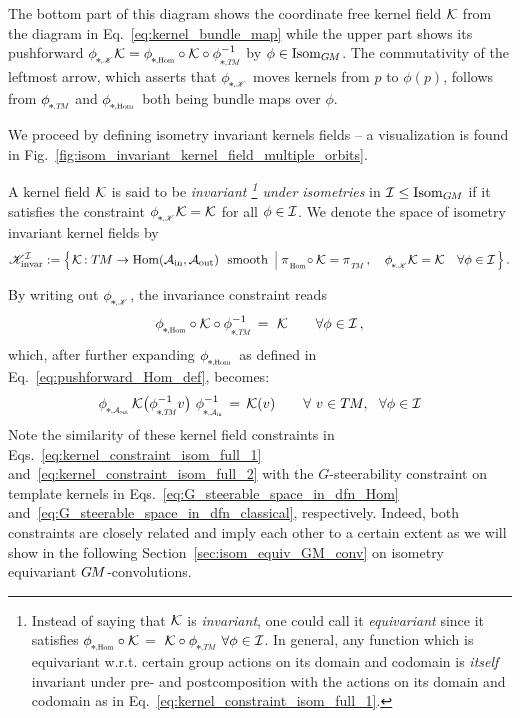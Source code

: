 The bottom part of this diagram shows the coordinate free kernel field $\mathcal{K}$ from the diagram in Eq.~\eqref{eq:kernel_bundle_map} while the upper part shows its pushforward $\dphiK \K = \dphiHom \!\circ \K \circ \dphiTMinv$ by $\phi \in \operatorname{Isom}_{G\mkern-1.4muM}$.
The commutativity of the leftmost arrow, which asserts that $\dphiK$ moves kernels from $p$ to $\phi(p)$, follows from $\dphiTM$ and $\dphiHom$ both being bundle maps over $\phi$.


We proceed by defining isometry invariant kernels fields -- a visualization is found in Fig.~\ref{fig:isom_invariant_kernel_field_multiple_orbits}.
\begin{dfn}
\label{dfn:isometry_invariant_kernel_fields}
    A kernel field $\mathcal{K}$ is said to be \emph{invariant%
    \footnote{
        Instead of saying that $\mathcal{K}$ is \emph{invariant}, one could call it \emph{equivariant} since it satisfies
        $\dphiHom \!\circ \K \,=\ \K \circ \dphiTM \ \forall \phi\in\I$.
        In general, any function which is equivariant w.r.t. certain group actions on its domain and codomain is \emph{itself} invariant under pre- and postcomposition with the actions on its domain and codomain as in Eq.~\eqref{eq:kernel_constraint_isom_full_1}.
    }
    under isometries} in $\mathcal{I} \leq \operatorname{Isom}_{G\mkern-1.4muM}$ if it satisfies the constraint $\dphiK \K = \K$ for all $\phi \in \mathcal{I}$.
    We denote the space of isometry invariant kernel fields by
    \begin{align}\label{eq:KIfull_def}
        \KIfull :=
            \pig\{\mkern2mu \K\mkern-2mu:\TM\to \Hom(\Ain,\Aout) \ \ \textup{smooth}\ \,\pig|\; 
            \piHom\!\circ\K = \piTM \,,\ \ \ 
            \dphiK \K  = \K \quad \forall \phi\in\I \,\pig\} \,.
    \end{align}
\end{dfn}
By writing out $\dphiK$, the invariance constraint reads
\begin{align}\label{eq:kernel_constraint_isom_full_1}
    \dphiHom \!\circ \K \circ \dphiTMinv \,=\ \K \qquad \forall \phi\in\I \,,
\end{align}
which, after further expanding $\dphiHom$ as defined in Eq.~\eqref{eq:pushforward_Hom_def}, becomes:
\begin{align}\label{eq:kernel_constraint_isom_full_2}
    \dphiAout
    \K \big(\dphiTMinv v\big) \ 
    \dphiAininv
    =\,
    \K(v) \qquad \forall\ v\in \TM,\ \ \forall \phi \in \I
\end{align}
Note the similarity of these kernel field constraints in
Eqs.~\eqref{eq:kernel_constraint_isom_full_1} and~\eqref{eq:kernel_constraint_isom_full_2} with the $G$-steerability constraint on template kernels in Eqs.~\eqref{eq:G_steerable_space_in_dfn_Hom} and~\eqref{eq:G_steerable_space_in_dfn_classical}, respectively.
Indeed, both constraints are closely related and imply each other to a certain extent as we will show in the following Section~\ref{sec:isom_equiv_GM_conv} on isometry equivariant $G\mkern-1.4muM$-convolutions.


